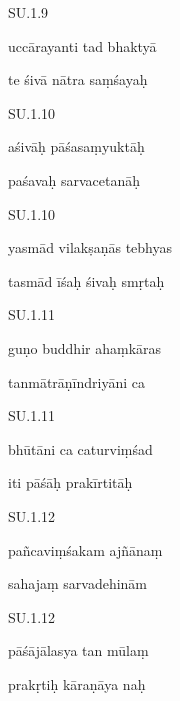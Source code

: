 \documentclass{article}
\begin{document}
	    
		SU.1.9 
    
	    
		uccārayanti tad bhaktyā 
    
	    
		te śivā nātra saṃśayaḥ 
    

    
	
	    
		SU.1.10 
    
	    
		aśivāḥ pāśasaṃyuktāḥ 
    
	    
		paśavaḥ sarvacetanāḥ 
    

    
	
	    
		SU.1.10 
    
	    
		yasmād vilakṣaṇās tebhyas 
    
	    
		tasmād īśaḥ śivaḥ smṛtaḥ 
    

    
	
	    
		SU.1.11 
    
	    
		guṇo buddhir ahaṃkāras 
    
	    
		tanmātrāṇīndriyāni ca 
    

    
	
	    
		SU.1.11 
    
	    
		bhūtāni ca caturviṃśad 
    
	    
		iti pāśāḥ prakīrtitāḥ 
    

    
	
	    
		SU.1.12 
    
	    
		pañcaviṃśakam ajñānaṃ 
    
	    
		sahajaṃ sarvadehinām 
    

    
	
	    
		SU.1.12 
    
	    
		pāśājālasya tan mūlaṃ 
    
	    
		prakṛtiḥ kāraṇāya naḥ 
    
\end{document}
